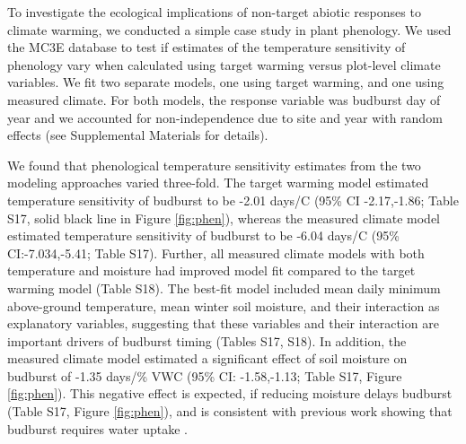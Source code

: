 \documentclass{article}
\begin{document}
\par To investigate the ecological implications of non-target abiotic responses to climate warming, we conducted a simple case study in plant phenology. We used the MC3E database to test if estimates of the temperature sensitivity of phenology vary when calculated using target warming versus plot-level climate variables. We fit two separate models, one using target warming, and one using measured climate. For both models, the response variable was budburst day of year and we accounted for non-independence due to site and year with random effects (see Supplemental Materials for details).%

\par We found that phenological temperature sensitivity estimates from the two modeling approaches varied three-fold. The target warming model estimated temperature sensitivity of budburst to be -2.01 days/\degree C (95\% CI -2.17,-1.86; Table S17, solid black line in Figure \ref{fig:phen}), whereas the measured climate model estimated temperature sensitivity of budburst to be -6.04 days/\degree C (95\% CI:-7.034,-5.41; Table S17). Further, all measured climate models with both temperature and moisture had improved model fit compared to the target warming model (Table S18). The best-fit model included mean daily minimum above-ground temperature, mean winter soil moisture, and their interaction as explanatory variables, suggesting that these variables and their interaction are important drivers of budburst timing (Tables S17, S18). 
In addition, the measured climate model estimated a significant effect of soil moisture on budburst of -1.35 days/\% VWC (95\% CI: -1.58,-1.13; Table S17, Figure \ref{fig:phen}). This negative effect is expected, if reducing moisture delays budburst (Table S17, Figure \ref{fig:phen}), and is consistent with previous work showing that budburst requires water uptake \citep{essiamah1986}. 
\end{document}
